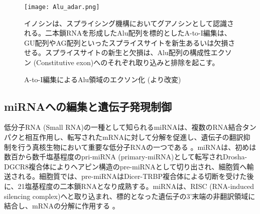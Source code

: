 \begin{figure}[!h]
	\begin{center}
		\texttt{[image: Alu\_adar.png]}
	\end{center}
	\caption{A-to-I編集によるAlu領域のエクソン化 (\cite{Nishikura:2006aa}より改変)}
	\begin{flushleft}
		\small{イノシンは、スプライシング機構においてグアノシンとして認識される。二本鎖RNAを形成したAlu配列を標的としたA-to-I編集は、GU配列やAG配列といったスプライスサイトを新生あるいは欠損させる。スプライスサイトの新生と欠損は、Alu配列の構成性エクソン (Constitutive exon)へのそれぞれ取り込みと排除を起こす。}
	\end{flushleft}
	\label{fig:Alu_adar}
\end{figure}

\subsection{miRNAへの編集と遺伝子発現制御}
低分子RNA (Small RNA)の一種として知られるmiRNAは、複数のRNA結合タンパクと相互作用し、転写されたmRNAに対して分解を促進し、遺伝子の翻訳抑制を行う真核生物において重要な低分子RNAの一つである \citep{KroLoeFil1009}。miRNAは、初めは数百から数千塩基程度のpri-miRNA (primary-miRNA)として転写されDrosha-DGCR8複合体によりヘアピン構造のpre-miRNAとして切り出され、細胞質へ輸送される。細胞質では、pre-miRNAはDicer-TRBP複合体による切断を受けた後に、21塩基程度の二本鎖RNAとなり成熟する。miRNAは、RISC (RNA-induced silencing complex)へと取り込まれ、標的となった遺伝子の3'末端の非翻訳領域に結合し、mRNAの分解に作用する \citep{CarSon0902}。

